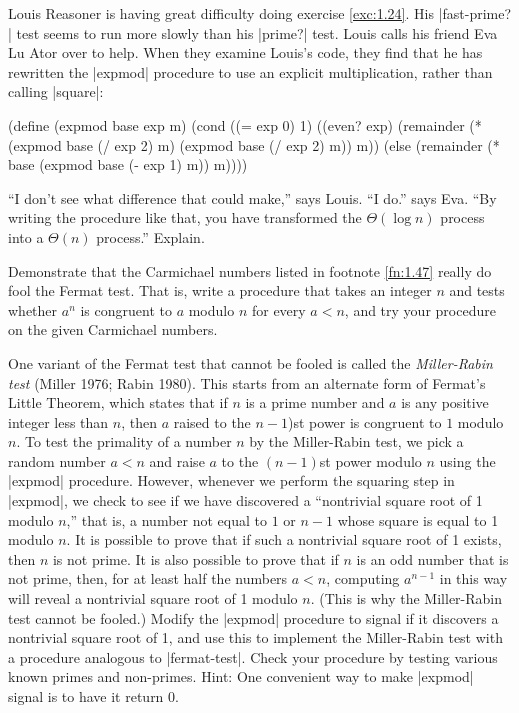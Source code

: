 \begin{Exercise}
\label{exc:1.26}
Louis Reasoner is having great difficulty doing exercise
\ref{exc:1.24}.  His \scheme|fast-prime?| test seems to run more
slowly than his \scheme|prime?| test.  Louis calls his friend Eva Lu
Ator over to help.  When they examine Louis's code, they find that he
has rewritten the \scheme|expmod| procedure to use an explicit
multiplication, rather than calling \scheme|square|:

\begin{schemedisplay}
(define (expmod base exp m)
  (cond ((= exp 0) 1)
        ((even? exp)
         (remainder (* (expmod base (/ exp 2) m)
                       (expmod base (/ exp 2) m))
                    m))
        (else
         (remainder (* base (expmod base (- exp 1) m))
                    m))))
\end{schemedisplay}
``I don't see what difference that could make,'' says Louis.  ``I
do.''  says Eva.  ``By writing the procedure like that, you have
transformed the $\Theta(\log n)$ process into a $\Theta(n)$ process.''
Explain.
\end{Exercise}

\begin{Exercise}
\label{exc:1.27}
Demonstrate that the Carmichael numbers listed in footnote \ref{fn:1.47}
really do fool the Fermat test.  That is, write a procedure that takes
an integer $n$ and tests whether $a^n$ is congruent to $a$ modulo $n$
for every $a < n$, and try your procedure on the given Carmichael
numbers.
\end{Exercise}

\begin{Exercise}
\label{exc:1.28}
One variant of the Fermat test that cannot be fooled is called the
\textit{Miller-Rabin test} (Miller 1976; Rabin 1980).  This starts from
an alternate form of Fermat's Little Theorem, which states that if $n$
is a prime number and $a$ is any positive integer less than $n$, then
$a$ raised to the $n - 1$)st power is congruent to $1$ modulo $n$.  To test
the primality of a number $n$ by the Miller-Rabin test, we pick a
random number $a < n$ and raise $a$ to the $(n - 1)$st power modulo $n$
using the \scheme|expmod| procedure.  However, whenever we perform the
squaring step in \scheme|expmod|, we check to see if we have discovered a
``nontrivial square root of 1 modulo $n$,'' that is, a number not
equal to $1$ or $n - 1$ whose square is equal to 1 modulo $n$.  It is
possible to prove that if such a nontrivial square root of 1 exists,
then $n$ is not prime.  It is also possible to prove that if $n$ is an
odd number that is not prime, then, for at least half the numbers
$a < n$, computing $a^{n-1}$ in this way will reveal a nontrivial
square root of 1 modulo $n$.  (This is why the Miller-Rabin test
cannot be fooled.)  Modify the \scheme|expmod| procedure to signal if it
discovers a nontrivial square root of 1, and use this to implement
the Miller-Rabin test with a procedure analogous to \scheme|fermat-test|.
Check your procedure by testing various known primes and non-primes.
Hint: One convenient way to make \scheme|expmod| signal is to have it
return 0.
\end{Exercise}